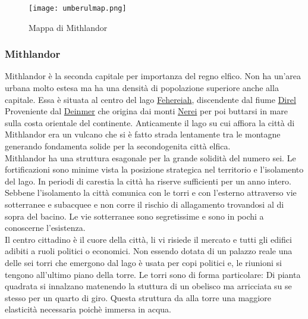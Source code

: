 \documentclass[10pt,twoside,twocolumn]{article}
\begin{document}
\begin{figure}[h]
\centering
\texttt{[image: umberulmap.png]}
\caption{Mappa di Mithlandor}
\end{figure}


\subsubsection{Mithlandor}\label{cyt:mithlandor}
Mithlandor \`e la seconda capitale per importanza del regno elfico. Non ha
un'area urbana molto estesa ma ha una densit\`a di popolazione superiore anche alla
capitale. Essa \`e situata al centro del lago \hyperref[loc:fehereiah]{Fehereiah}, discendente dal fiume
\hyperref[loc:direl]{Direl} Proveniente dal \hyperref[loc:deinmer]{Deinmer} che origina dai monti
\hyperref[loc:nerei]{Nerei} per poi buttarsi in mare sulla costa orientale del continente.
Anticamente il lago su cui affiora la citt\`a di Mithlandor era un vulcano che
si \`e fatto strada lentamente tra le montagne generando fondamenta solide per la
secondogenita citt\`a elfica.\\
Mithlandor ha una struttura esagonale per la grande solidit\`a del numero sei. Le fortificazioni
sono minime vista la posizione strategica nel territorio e l'isolamento del lago. In periodi
di carestia la citt\`a ha riserve sufficienti per un anno intero. Sebbene l'isolamento la
citt\`a comunica con le torri e con l'esterno attraverso vie sotterranee e subacquee e non corre il
rischio di allagamento trovandosi al di sopra del bacino. Le vie sotterranee sono segretissime e sono in
pochi a conoscerne l'esistenza.\\
Il centro cittadino \`e il cuore della citt\`a, li vi risiede il mercato e tutti gli edifici adibiti
a ruoli politici o economici.
Non essendo dotata di un palazzo reale una delle sei torri che emergono dal lago \`e usata per copi politici
e, le riunioni si tengono all'ultimo piano della torre. Le torri sono di forma particolare:
Di pianta quadrata si innalzano matenendo la stuttura di un obelisco ma arricciata su se stesso
per un quarto di giro. Questa struttura da alla torre una maggiore elasticit\`a necessaria
poich\`e immersa in acqua.
\end{document}
